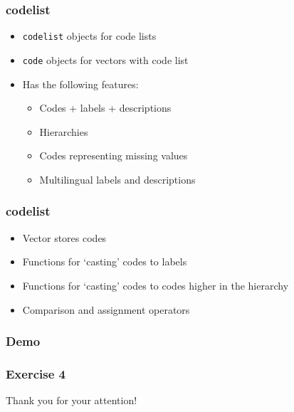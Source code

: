\documentclass[aspectratio=1610]{beamer}
\begin{document}
\begin{frame}
  \frametitle{codelist}
  \begin{itemize}
    \item \texttt{codelist} objects for code lists
    \item \texttt{code} objects for vectors with code list
    \item Has the following features:
    \begin{itemize}
      \item Codes + labels + descriptions
      \item Hierarchies
      \item Codes representing missing values
      \item Multilingual labels and descriptions
    \end{itemize}
  \end{itemize}
\end{frame}

\begin{frame}
  \frametitle{codelist}
  \begin{itemize}
    \item Vector stores codes
    \item Functions for `casting' codes to labels 
    \item Functions for `casting' codes to codes higher in the hierarchy
    \item Comparison and assignment operators
  \end{itemize}
\end{frame}

\begin{frame}
  \frametitle{Demo}
\end{frame}

\begin{frame}
  \frametitle{Exercise 4}
\end{frame}


%



\invert
\begin{frame}[plain]

	Thank you for your attention!
\end{frame}
\revert
\end{document}
